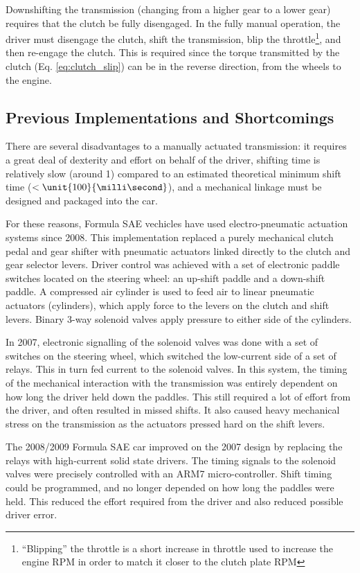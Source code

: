 Downshifting the transmission (changing from a higher gear to a lower gear) requires that the clutch be fully disengaged. In the fully manual operation, the driver must disengage the clutch, shift the transmission, blip the throttle\footnote{``Blipping'' the throttle is a short increase in throttle used to increase the engine RPM in order to match it closer to the clutch plate RPM}, and then re-engage the clutch. This is required since the torque transmitted by the clutch (Eq. \ref{eq:clutch_slip}) can be in the reverse direction, from the wheels to the engine.

\subsection{Previous Implementations and Shortcomings}

There are several disadvantages to a manually actuated transmission: it requires a great deal of dexterity and effort on behalf of the driver, shifting time is relatively slow (around \unit{1}{\second}) compared to an estimated theoretical minimum shift time ($<\unit{100}{\milli\second}$), and a mechanical linkage must be designed and packaged into the car.

For these reasons, Formula SAE vechicles have used electro-pneumatic actuation systems since 2008. This implementation replaced a purely mechanical clutch pedal and gear shifter with pneumatic actuators linked directly to the clutch and gear selector levers. Driver control was achieved with a set of electronic paddle switches located on the steering wheel: an up-shift paddle and a down-shift paddle. A compressed air cylinder is used to feed air to linear pneumatic actuators (cylinders), which apply force to the levers on the clutch and shift levers. Binary 3-way solenoid valves apply pressure to either side of the cylinders.

In 2007, electronic signalling of the solenoid valves was done with a set of switches on the steering wheel, which switched the low-current side of a set of relays. This in turn fed current to the solenoid valves. In this system, the timing of the mechanical interaction with the transmission was entirely dependent on how long the driver held down the paddles. This still required a lot of effort from the driver, and often resulted in missed shifts. It also caused heavy mechanical stress on the transmission as the actuators pressed hard on the shift levers.

The 2008/2009 Formula SAE car improved on the 2007 design by replacing the relays with high-current solid state drivers. The timing signals to the solenoid valves were precisely controlled with an ARM7 micro-controller. Shift timing could be programmed, and no longer depended on how long the paddles were held. This  reduced the effort required from the driver and also reduced possible driver error.

